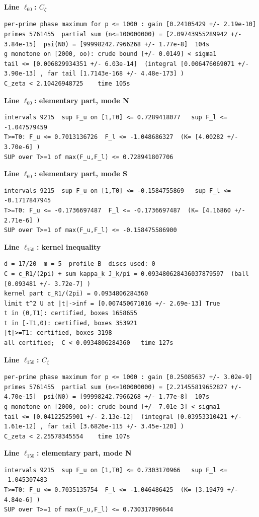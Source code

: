 \documentclass[11pt,reqno]{amsart}
\numberwithin{equation}{section}
\theoremstyle{definition}
\theoremstyle{remark}
\newcommand{\appsub}[1]{\par\medskip\noindent\textbf{#1}\par\nobreak\smallskip}
\begin{document}
\appsub{Line $\ell_{60}$: $C_\zeta$}
\begin{lstlisting}
per-prime phase maximum for p <= 1000 : gain [0.24105429 +/- 2.19e-10]
primes 5761455  partial sum (n<=100000000) = [2.09743955289942 +/- 3.84e-15]  psi(N0) = [99998242.7966268 +/- 1.77e-8]  104s
g monotone on [2000, oo): crude bound [+/- 0.0149] < sigma1
tail <= [0.006829934351 +/- 6.03e-14]  (integral [0.006476069071 +/- 3.90e-13] , far tail [1.7143e-168 +/- 4.48e-173] )
C_zeta < 2.10426948725    time 105s
\end{lstlisting}
\appsub{Line $\ell_{60}$: elementary part, mode N}
\begin{lstlisting}
intervals 9215  sup F_u on [1,T0] <= 0.7289418077   sup F_l <= -1.047579459
T>=T0: F_u <= 0.7013136726  F_l <= -1.048686327  (K= [4.00282 +/- 3.70e-6] )
SUP over T>=1 of max(F_u,F_l) <= 0.728941807706
\end{lstlisting}
\appsub{Line $\ell_{60}$: elementary part, mode S}
\begin{lstlisting}
intervals 9215  sup F_u on [1,T0] <= -0.1584755869   sup F_l <= -0.1717847945
T>=T0: F_u <= -0.1736697487  F_l <= -0.1736697487  (K= [4.16860 +/- 2.71e-6] )
SUP over T>=1 of max(F_u,F_l) <= -0.158475586900
\end{lstlisting}
\appsub{Line $\ell_{150}$: kernel inequality}
\begin{lstlisting}
d = 17/20  m = 5  profile B  discs used: 0
C = c_R1/(2pi) + sum kappa_k J_k/pi = 0.093480628436037879597  (ball [0.093481 +/- 3.72e-7] )
kernel part c_R1/(2pi) = 0.0934806284360
limit t^2 U at |t|->inf = [0.007450671016 +/- 2.69e-13] True
t in (0,T1]: certified, boxes 1658655
t in [-T1,0): certified, boxes 353921
|t|>=T1: certified, boxes 3198
all certified;  C < 0.0934806284360   time 127s
\end{lstlisting}
\appsub{Line $\ell_{150}$: $C_\zeta$}
\begin{lstlisting}
per-prime phase maximum for p <= 1000 : gain [0.25085637 +/- 3.02e-9]
primes 5761455  partial sum (n<=100000000) = [2.21455819652827 +/- 4.70e-15]  psi(N0) = [99998242.7966268 +/- 1.77e-8]  107s
g monotone on [2000, oo): crude bound [+/- 7.01e-3] < sigma1
tail <= [0.04122525901 +/- 2.13e-12]  (integral [0.03953310421 +/- 1.61e-12] , far tail [3.6826e-115 +/- 3.45e-120] )
C_zeta < 2.25578345554    time 107s
\end{lstlisting}
\appsub{Line $\ell_{150}$: elementary part, mode N}
\begin{lstlisting}
intervals 9215  sup F_u on [1,T0] <= 0.7303170966   sup F_l <= -1.045307483
T>=T0: F_u <= 0.7035135754  F_l <= -1.046486425  (K= [3.19479 +/- 4.84e-6] )
SUP over T>=1 of max(F_u,F_l) <= 0.730317096644
\end{lstlisting}
\end{document}
